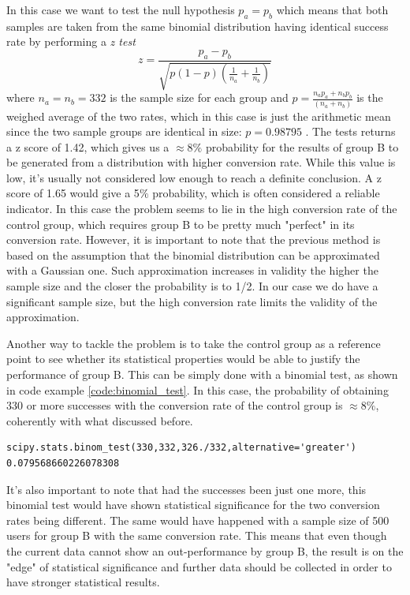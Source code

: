 \documentclass[paper=a4, fontsize=10pt]{report}
\begin{document}
In this case we want to test the null hypothesis $p_{a} = p_{b}$ which means that both samples are taken from the same binomial distribution having identical
 success rate by performing a \textit{z test}
\begin{equation}
 z = \frac{p_{a}-p_{b}}{\sqrt{p(1-p)(\frac{1}{n_{a}} + \frac{1}{n_{b}})}}
\end{equation}
where $n_{a} = n_{b} = 332 $ is the sample size for each group and $ p = \frac{n_{a}p_{a} + n_{b}p_{b}}{ (n_{a} + n_{b})}$ is the weighed average of the two rates,
which in this case is just the arithmetic mean since the two sample groups are identical in size: $p = 0.98795$
. The tests returns a z score of 1.42, which gives us a $\approx 8\%$ probability for the results of group B to be generated from a distribution with higher
conversion rate.
While this value is low, it's usually not considered low enough to reach a definite conclusion. A z score of 1.65 would give a 5$\%$ probability,
which is often considered a reliable indicator. In this case the problem seems to lie in the high conversion rate of the control group,
which requires group B to be pretty much "perfect" in its conversion rate.
However, it is important to note that the previous method is based on the assumption that the binomial distribution can be approximated with a Gaussian one.
Such approximation increases in validity the higher the sample size and the closer the probability is to 1/2. In our case we do have a significant sample size, but the 
high conversion rate limits the validity of the approximation.

Another way to tackle the problem is to take the control group as a reference point to see whether its statistical properties would be
able to justify the performance of group B. This can be simply done with a binomial test, as shown in code example \ref{code:binomial_test}. In this case, 
the probability
of obtaining 330 or more successes with the conversion rate of the control group is $\approx 8\%$, 
coherently with what discussed before.

\footnotesize
\begin{lstlisting}[frame=single,caption= Binomial Test\label{code:binomial_test}]
scipy.stats.binom_test(330,332,326./332,alternative='greater')
0.079568660226078308
\end{lstlisting}
\normalsize

It's also important to note that had the successes been just one more, this binomial test would have shown statistical significance
for the two conversion rates being different. The same would have happened with a sample size of 500 users for group B with the 
same conversion rate.
This means that even though the current data cannot show an out-performance by 
group B, the result is on the "edge" of statistical significance and further data should be collected in order to have stronger
statistical results.
\end{document}
